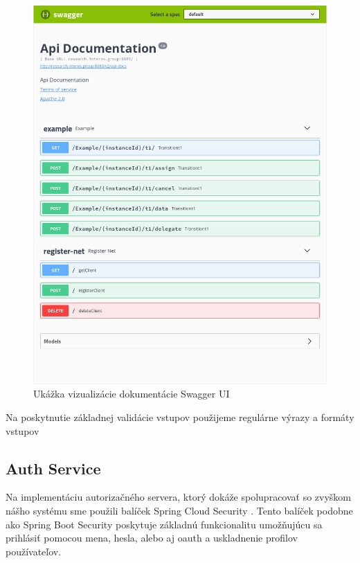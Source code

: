 \begin{figure}[!htbp] 
	\centering 
	\includegraphics[width=16cm]{img/swagger_ui.png} 
	\caption{Ukážka vizualizácie dokumentácie Swagger UI} 
	\label{swagger_ui} 
\end{figure}


Na poskytnutie základnej validácie vstupov použijeme regulárne výrazy a formáty vstupov 





\subsection{Auth Service}  \label{section_auth}

Na implementáciu autorizačného servera, ktorý dokáže spolupracovať so zvyškom nášho systému sme použili balíček Spring Cloud Security \cite{cloud_security}. Tento balíček podobne ako Spring Boot Security poskytuje základnú funkcionalitu umožňujúcu sa prihlásiť pomocou mena, hesla, alebo aj \acrshort{oauth} a uskladnenie profilov používateľov.  

